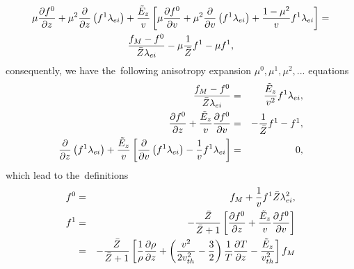 \documentclass[preprint,12pt]{elsarticle}
\begin{document}
\begin{multline}
  \mu\frac{\partial{f^0}}{\partial{z}} + \mu^2 \frac{\partial{}}{\partial{z}}\left(f^1 \lambda_{ei} \right)
  + \frac{\tilde{E}_z}{v} \left[ \mu \frac{\partial{f^0}}{\partial{v}} 
  + \mu^2 \frac{\partial{}}{\partial{v}} \left( f^1 \lambda_{ei} \right) 
  + \frac{1 - \mu^2}{v}f^1 \lambda_{ei}
  \right] 
  =\\
  \frac{f_M - f^0}{\bar{Z}\lambda_{ei}} - \mu \frac{1}{\bar{Z}}f^1
  - \mu f^1 ,
  \label{eq:BGK_spherical}
\end{multline}
consequently, we have the~following anisotropy expansion 
$\mu^0, \mu^1, \mu^2, ...$ equations
\begin{eqnarray}
  \frac{f_M - f^0}{\bar{Z}\lambda_{ei}} &=& \frac{\tilde{E}_z}{v^2}f^1 \lambda_{ei} , 
  \nonumber \\
  \frac{\partial{f^0}}{\partial{z}} + \frac{\tilde{E}_z}{v}\frac{\partial{f^0}}{\partial{v}} &=& 
  - \frac{1}{\bar{Z}}f^1 - f^1 , 
  \nonumber \\ 
  \frac{\partial{}}{\partial{z}}\left(f^1 \lambda_{ei} \right) 
  + \frac{\tilde{E}_z}{v} \left[\frac{\partial{}}{\partial{v}} \left( f^1 \lambda_{ei} \right)
  - \frac{1}{v}f^1 \lambda_{ei} \right] &=& 0 , \nonumber
\end{eqnarray}
which lead to the~definitions
\begin{eqnarray}
  f^0 &=& f_M + \frac{1}{v}f^1 \bar{Z}\lambda_{ei}^2 ,
  \label{eq:BGK_f0} \\
  f^1 &=& - \frac{\bar{Z}}{\bar{Z}+1}
  \left[ \frac{\partial{f^0}}{\partial{z}} + \frac{\tilde{E}_z}{v}\frac{\partial{f^0}}{\partial{v}} \right] 
  \nonumber \\
  &=& - \frac{\bar{Z}}{\bar{Z}+1}
  \left[\frac{1}{\rho}\frac{\partial{\rho}}{\partial{z}} + 
  \left( \frac{v^2}{2 v_{th}^2} - \frac{3}{2}\right)
  \frac{1}{T}\frac{\partial{T}}{\partial{z}} - \frac{\tilde{E}_z}{v_{th}^2} \right]f_M 
  \label{eq:BGK_f1}
\end{eqnarray}
\end{document}
